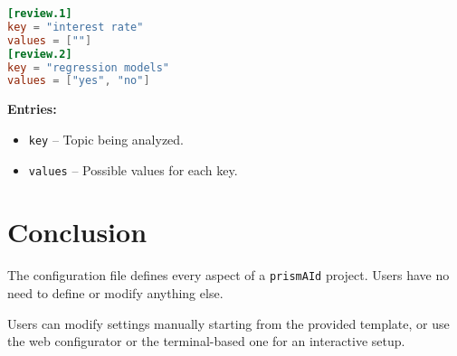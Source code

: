 \begin{configbox}
\begin{lstlisting}[language=TOML]
[review.1]
key = "interest rate"
values = [""]
[review.2]
key = "regression models"
values = ["yes", "no"]
\end{lstlisting}
\end{configbox}

\textbf{Entries:}
\begin{itemize}
    \item \texttt{key} – Topic being analyzed.
    \item \texttt{values} – Possible values for each key.
\end{itemize}

\section{Conclusion}

The configuration file defines every aspect of a \texttt{prismAId} project. Users have no need to define or modify anything else. 

Users can modify settings manually starting from the provided template, or use the web configurator or the terminal-based one for an interactive setup.

